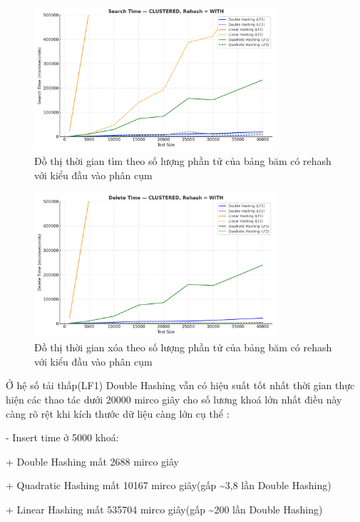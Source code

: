 \documentclass[12pt,a4paper]{report}
\begin{document}
\begin{figure}[!ht]
    \centering
    \includegraphics[width=0.8\textwidth]{clus_sear_hash.png}
    \caption{Đồ thị thời gian tìm theo số lượng phần tử của bảng băm có rehash với kiểu đầu vào phân cụm}
    \label{fig:flowchart}
\end{figure}

\begin{figure}[!ht]
    \centering
    \includegraphics[width=0.8\textwidth]{clus_del_hash.png}
    \caption{Đồ thị thời gian xóa theo số lượng phần tử của bảng băm có rehash với kiểu đầu vào phân cụm}
    \label{fig:flowchart}
\end{figure}
\noindent \indent Ở hệ số tải thấp(LF1) Double Hashing vẫn có hiệu suất tốt nhất thời gian thực hiện các thao tác dưới 20000 mirco giây cho số lương khoá lớn nhất điều này càng rõ rệt khi kích thước dữ liệu càng lớn cụ thể :

-	Insert time ở 5000 khoá:

\hspace{1cm}+ Double Hashing mất 2688 mirco giây

\hspace{1cm}+ Quadratic Hashing mất 10167 mirco giây(gấp \textasciitilde 3,8 lần Double Hashing)

\hspace{1cm}+ Linear Hashing mất 535704 mirco giây(gấp \textasciitilde 200 lần Double Hashing)
\end{document}
